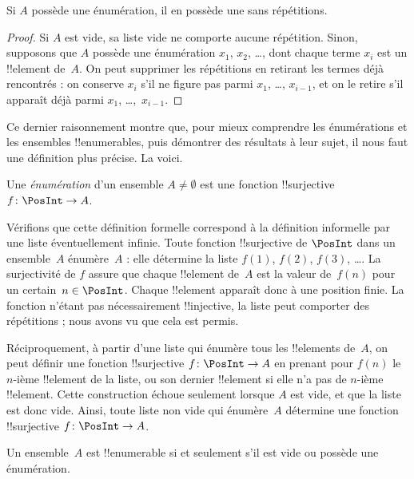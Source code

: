 \documentclass[11pt,a4paper,openany]{memoir}
\begin{document}
\begin{prop}
Si $A$ possède une énumération, il en possède une sans répétitions.
\end{prop}

\begin{proof}
Si $A$ est vide, sa liste vide ne comporte aucune répétition.
Sinon, supposons que $A$ possède une énumération $x_1$, $x_2$, \dots{}, dont
chaque terme $x_i$ est un !!{element} de~$A$. On peut supprimer les
répétitions en retirant les termes déjà rencontrés : on conserve $x_i$
s’il ne figure pas parmi $x_1$, \dots, $x_{i-1}$, et on le retire
s’il apparaît déjà parmi $x_1$, \dots,~$x_{i-1}$.
\end{proof}

Ce dernier raisonnement montre que, pour mieux comprendre les
énumérations et les ensembles !!{enumerable}s, puis démontrer des
résultats à leur sujet, il nous faut une définition plus précise.
La voici.

\begin{defn}
Une \emph{énumération} d’un ensemble $A \neq \emptyset$ est une
fonction !!{surjective} $f \colon \PosInt \to A$.
\end{defn}

\begin{explain}
Vérifions que cette définition formelle correspond à la définition
informelle par une liste éventuellement infinie. Toute fonction
!!{surjective} de $\PosInt$ dans un ensemble~$A$ énumère~$A$ : elle
détermine la liste $f(1)$, $f(2)$, $f(3)$, \dots. La surjectivité de $f$
assure que chaque !!{element} de~$A$ est la valeur de~$f(n)$ pour
un certain~$n \in \PosInt$. Chaque !!{element} apparaît donc à une
position finie. La fonction n’étant pas nécessairement !!{injective},
la liste peut comporter des répétitions ; nous avons vu que cela
est permis.

Réciproquement, à partir d’une liste qui énumère tous les !!{element}s
de~$A$, on peut définir une fonction !!{surjective} $f\colon \PosInt \to A$
en prenant pour $f(n)$ le $n$-ième !!{element} de la liste, ou son dernier
!!{element} si elle n’a pas de $n$-ième !!{element}. Cette construction
échoue seulement lorsque $A$ est vide, et que la liste est donc vide.
Ainsi, toute liste non vide qui énumère~$A$ détermine une fonction
!!{surjective} $f\colon \PosInt \to A$.
\end{explain}

\begin{defn}
Un ensemble~$A$ est !!{enumerable} si et seulement s’il est vide
ou possède une énumération.
\end{defn}
\end{document}
